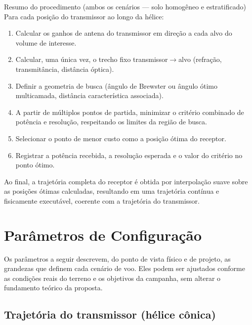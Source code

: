 \documentclass[11pt,a4paper]{article}
\begin{document}
\begin{resultado}{Resumo do procedimento (ambos os cenários — solo homogêneo e estratificado)}
Para cada posição do transmissor ao longo da hélice:
\begin{enumerate}[nosep]
  \item Calcular os ganhos de antena do transmissor em direção a cada alvo do volume de interesse.
  \item Calcular, uma única vez, o trecho fixo transmissor$\to$alvo (refração, transmitância,
  distância óptica).
  \item Definir a geometria de busca (ângulo de Brewster ou ângulo ótimo multicamada, distância
  característica associada).
  \item A partir de múltiplos pontos de partida, minimizar o critério combinado de potência e
  resolução, respeitando os limites da região de busca.
  \item Selecionar o ponto de menor custo como a posição ótima do receptor.
  \item Registrar a potência recebida, a resolução esperada e o valor do critério no ponto ótimo.
\end{enumerate}
Ao final, a trajetória completa do receptor é obtida por interpolação suave sobre as posições
ótimas calculadas, resultando em uma trajetória contínua e fisicamente executável, coerente com a
trajetória do transmissor.
\end{resultado}

\section{Parâmetros de Configuração}

Os parâmetros a seguir descrevem, do ponto de vista físico e de projeto, as grandezas que definem
cada cenário de voo. Eles podem ser ajustados conforme as condições reais do terreno e os
objetivos da campanha, sem alterar o fundamento teórico da proposta.

\subsection{Trajetória do transmissor (hélice cônica)}
\end{document}
